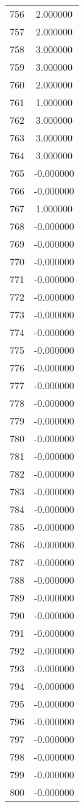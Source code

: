 \documentclass[12pt]{article}
\begin{document}
\begin{longtable}{@{}cc@{}}
756 & 2.000000 \\
757 & 2.000000 \\
758 & 3.000000 \\
759 & 3.000000 \\
760 & 2.000000 \\
761 & 1.000000 \\
762 & 3.000000 \\
763 & 3.000000 \\
764 & 3.000000 \\
765 & -0.000000 \\
766 & -0.000000 \\
767 & 1.000000 \\
768 & -0.000000 \\
769 & -0.000000 \\
770 & -0.000000 \\
771 & -0.000000 \\
772 & -0.000000 \\
773 & -0.000000 \\
774 & -0.000000 \\
775 & -0.000000 \\
776 & -0.000000 \\
777 & -0.000000 \\
778 & -0.000000 \\
779 & -0.000000 \\
780 & -0.000000 \\
781 & -0.000000 \\
782 & -0.000000 \\
783 & -0.000000 \\
784 & -0.000000 \\
785 & -0.000000 \\
786 & -0.000000 \\
787 & -0.000000 \\
788 & -0.000000 \\
789 & -0.000000 \\
790 & -0.000000 \\
791 & -0.000000 \\
792 & -0.000000 \\
793 & -0.000000 \\
794 & -0.000000 \\
795 & -0.000000 \\
796 & -0.000000 \\
797 & -0.000000 \\
798 & -0.000000 \\
799 & -0.000000 \\
800 & -0.000000 \\

\end{longtable}
\end{document}
